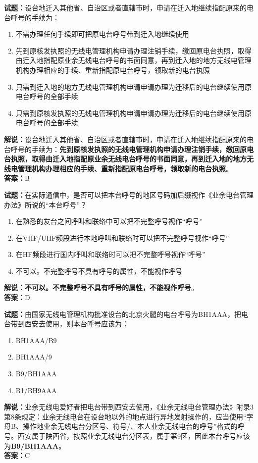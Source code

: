 \documentclass{ctexbook}
\begin{document}
\noindent\textbf{试题：}设台地迁入其他省、自治区或者直辖市时，申请在迁入地继续指配原来的电台呼号的手续为：
\begin{enumerate}[leftmargin=3em]
  \item 不需办理任何手续即可把原电台呼号带到迁入地继续使用
  \item 先到原核发执照的无线电管理机构申请办理注销手续，缴回原电台执照，取得由迁入地指配原业余无线电台呼号的书面同意，再到迁入地的地方无线电管理机构办理相应的手续、重新指配原电台呼号，领取新的电台执照
  \item 只需到迁入地的地方无线电管理机构申请申请办理为迁移后的电台继续使用原电台呼号的全部手续
  \item 只需到原核发执照的无线电管理机构申请申请办理为迁移后的电台继续使用原电台呼号的全部手续
\end{enumerate}
\noindent\textbf{解说：}设台地迁入其他省、自治区或者直辖市时，申请在迁入地继续指配原来的电台呼号的手续为：\textbf{先到原核发执照的无线电管理机构申请办理注销手续，缴回原电台执照，取得由迁入地指配原业余无线电台呼号的书面同意，再到迁入地的地方无线电管理机构办理相应的手续、重新指配原电台呼号，领取新的电台执照}。\\\noindent\textbf{答案：}B

\bigskip

\noindent\textbf{试题：}在实际通信中，是否可以把本台呼号的地区号码加后缀视作《业余电台管理办法》所说的“本台呼号”？
\begin{enumerate}[leftmargin=3em]
  \item 在熟悉的友台之间呼叫和联络中可以把不完整呼号视作“呼号”
  \item 在VHF/UHF频段进行本地呼叫和联络时可以把不完整呼号视作“呼号”
  \item 在HF频段进行国内呼叫和联络时可以把不完整呼号视作“呼号”
  \item 不可以。不完整呼号不具有呼号的属性，不能视作呼号
\end{enumerate}
\textbf{解说：不可以。不完整呼号不具有呼号的属性，不能视作呼号}。\\\noindent\textbf{答案：}D

\bigskip

\noindent\textbf{试题：}由国家无线电管理机构批准设台的北京火腿的电台呼号为BH1AAA，把电台带到西安去使用，则本台呼号应该为：
\begin{enumerate}[leftmargin=3em]
  \item BH1AAA/B9
  \item BH1AAA/9
  \item B9/BH1AAA
  \item B1/BH9AAA
\end{enumerate}
\noindent\textbf{解说：}业余无线电爱好者把电台带到西安去使用，《业余无线电台管理办法》附录3第8条规定：业余无线电台在设台地以外的地点进行异地发射操作的，应当使用“字母B、操作地业余无线电台分区号、符号/、本人业余无线电台的呼号”格式的呼号。西安属于陕西省，按照业余无线电台分区表，属于第9区，因此本台呼号应该为\textbf{B9/BH1AAA}。\\\noindent\textbf{答案：}C
\end{document}
